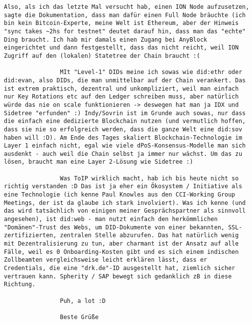 \begin{Verbatim}[breaklines=true, breaksymbol={}, breaksymbolsepleftnchars=2]
                Also, als ich das letzte Mal versucht hab, einen ION Node aufzusetzen, sagte die Dokumentation, dass man dafür einen Full Node bräuchte (ich bin kein Bitcoin-Experte, meine Welt ist Ethereum, aber der Hinweis "sync takes ~2hs for testnet" deutet darauf hin, dass man das "echte" Ding braucht. Ich hab mir damals einen Zugang bei AnyBlock  eingerichtet und dann festgestellt, dass das nicht reicht, weil ION Zugriff auf den (lokalen) Statetree der Chain braucht :(
                
                MIt "Level-1" DIDs meine ich sowas wie did:ethr oder did:evan, also DIDs, die man unmittelbar auf der Chain verankert. Das ist extrem praktisch, dezentral und unkompliziert, weil man einfach nur Key Rotations etc auf den Ledger schreiben muss, aber natürlich würde das nie on scale funktionieren -> deswegen hat man ja IDX und Sidetree "erfunden" :) Indy/Sovrin ist im Grunde auch sowas, nur dass die einfach eine dedizierte Blockchain nutzen (und vermutlich hoffen, dass sie nie so erfolgreich werden, dass die ganze Welt eine did:sov haben will :D). Am Ende des Tages skaliert Blockchain-Technologie im Layer 1 einfach nicht, egal wie viele dPoS-Konsensus-Modelle man sich ausdenkt - auch weil die Chain selbst ja immer nur wächst. Um das zu lösen, braucht man eine Layer 2-Lösung wie Sidetree :) 
                
                Was ToIP wirklich macht, hab ich bis heute nicht so richtig verstanden :D Das ist ja eher ein Ökosystem / Initiative als eine Technologie (ich kenne Paul Knowles aus den CCI-Working Group Meetings, der ist da glaube ich stark involviert). Was ich kenne (und das wird tatsächlich von einigen meiner Gesprächspartner als sinnvoll angesehen), ist did:web - man nutzt einfach den herkömmlichen "Domänen"-Trust des Webs, um DID-Dokumente von einer bekannten, SSL-zertifizierten, zentralen Stelle abzurufen. Das hat natürlich wenig mit Dezentralisierung zu tun, aber charmant ist der Ansatz auf alle Fälle, weil es 0 Onboarding-Kosten gibt und es sich einem indischen Zollbeamten vergleichsweise leicht erklären lässt, dass er Credentials, die eine "drk.de"-ID ausgestellt hat, ziemlich sicher vertrauen kann. Spherity / SAP bewegt sich gedanklich zB in diese Richtung.
                
                Puh, a lot :D 
                
                Beste Grüße
\end{Verbatim}

